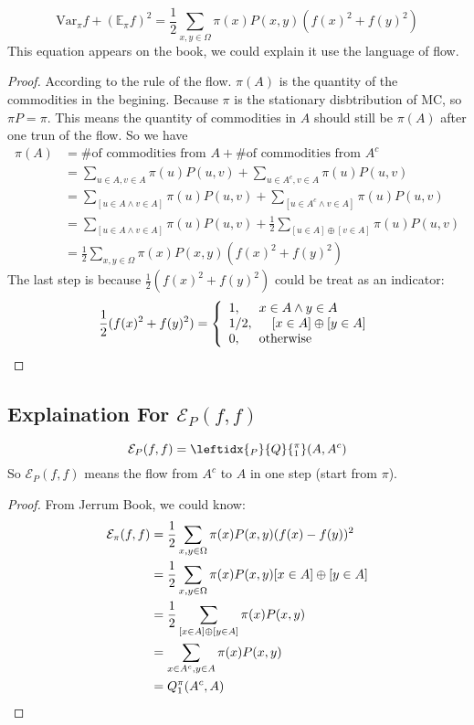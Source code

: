 \begin{lemma}
  \[\mathrm{Var}_\pi f + (\mathbb{E}_\pi f)^2 = \frac{1}{2} \sum_{x, y\in\Omega} \pi(x)P(x, y)(f(x)^2 + f(y)^2)\]
  \tcblower
  This equation appears on the book, we could explain it use the language of flow.
\end{lemma}
\begin{proof}
  According to the rule of the flow. $\pi(A)$ is the quantity of the commodities in the begining. Because $\pi$ is the stationary disbtribution of MC, so $\pi P = \pi$. This means the quantity of commodities in $A$ should still be $\pi(A)$ after one trun of the flow. So we have
  \begin{align*}
    \pi(A) &= \mbox{\# of commodities from $A$} + \mbox{\# of commodities from $A^c$} \\
    &= \sum_{u\in A, v\in A} \pi(u)P(u,v) + \sum_{u\in A^c, v\in A} \pi(u)P(u,v) \\
    &= \sum_{[u\in A\land v\in A]} \pi(u)P(u,v) + \sum_{[u\in A^c\land v\in A]} \pi(u)P(u,v) \\
    &= \sum_{[u\in A\land v\in A]} \pi(u)P(u,v) + \frac{1}{2}\sum_{[u\in A]\oplus[v\in A]} \pi(u)P(u,v) \\
    &= \frac{1}{2} \sum_{x,y\in\Omega} \pi(x)P(x, y) (f(x)^2 + f(y)^2)
  \end{align*}
  The last step is because $\frac{1}{2}(f(x)^2 + f(y)^2)$ could be treat as an indicator:
  \[
    \frac{1}{2}(f(x)^2 + f(y)^2) = \left\{
      \begin{array}{l}
        1, \hspace{0.5cm} x\in A\land y\in A \\
        1/2, \hspace{0.5cm} [x\in A]\oplus[y\in A] \\
        0, \hspace{0.5cm} \mbox{otherwise}
      \end{array}
    \right. \qedhere
  \]
\end{proof}
\subsection{Explaination For $\mathcal{E}_P(f ,f)$}
\begin{fact}
  \[\mathcal{E}_P(f, f) = \leftidx{_P}{Q}{_1^\pi} (A, A^c)\]
  \tcblower
  So $\mathcal{E}_P(f, f)$ means the flow from $A^c$ to $A$ in one step (start from $\pi$).
\end{fact}
\begin{proof}
  From Jerrum Book, we could know:
  \begin{align*}
    \mathcal{E}_\pi (f, f) &= \frac{1}{2} \sum_{x, y\in\Omega}\pi(x)P(x, y) (f(x) - f(y))^2 \\
    &= \frac{1}{2} \sum_{x, y\in\Omega}\pi(x)P(x, y) [x\in A]\oplus[y\in A] \\
    &= \frac{1}{2} \sum_{[x\in A]\oplus[y\in A]}\pi(x)P(x, y) \\
    &= \sum_{x\in A^c, y\in A}\pi(x)P(x, y) \\
    &= Q_1^\pi(A^c, A) \qedhere
  \end{align*}
\end{proof}

